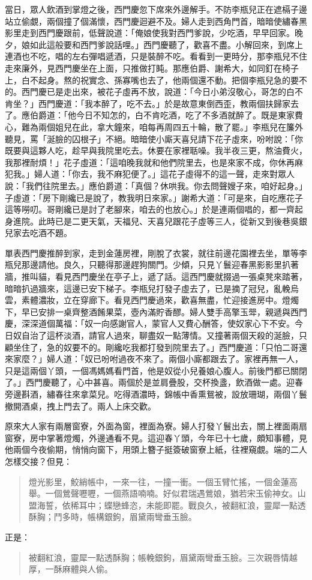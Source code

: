 當日，眾人飲酒到掌燈之後，西門慶忽下席來外邊解手。不防李瓶兒正在遮槅子邊站立偷覷，兩個撞了個滿懷，西門慶迴避不及。婦人走到西角門首，暗暗使繡春黑影里走到西門慶跟前，低聲說道：「俺娘使我對西門爹說，少吃酒，早早回家。晚夕，娘如此這般要和西門爹說話哩。」西門慶聽了，歡喜不盡。小解回來，到席上連酒也不吃，唱的左右彈唱遞酒，只是裝醉不吃。看看到一更時分，那李瓶兒不住走來廉外，見西門慶坐在上面，只推做打盹。那應伯爵、謝希大，如同釘在椅子上，白不起身。熬的祝實念、孫寡嘴也去了，他兩個還不動。把個李瓶兒急的要不的。西門慶已是走出來，被花子虛再不放，說道：「今日小弟沒敬心，哥怎的白不肯坐？」西門慶道：「我本醉了，吃不去。」於是故意東倒西歪，教兩個扶歸家去了。應伯爵道：「他今日不知怎的，白不肯吃酒，吃了不多酒就醉了。既是東家費心，難為兩個姐兒在此，拿大鐘來，咱每再周四五十輪，散了罷。」李瓶兒在簾外聽見，罵「涎臉的囚根子」不絕。暗暗使小廝天喜兒請下花子虛來，吩咐說：「你既要與這夥人吃，趁早與我院里吃去。休要在家裡聒噪。我半夜三更，熬油費火，我那裡耐煩！」花子虛道：「這咱晚我就和他們院里去，也是來家不成，你休再麻犯我。」婦人道：「你去，我不麻犯便了。」這花子虛得不的這一聲，走來對眾人說：「我們往院里去。」應伯爵道：「真個？休哄我。你去問聲嫂子來，咱好起身。」子虛道：「房下剛纔已是說了，教我明日來家。」謝希大道：「可是來，自吃應花子這等嘮叨。哥剛纔已是討了老腳來，咱去的也放心。」於是連兩個唱的，都一齊起身進院。此時已是二更天氣，天福兒、天喜兒跟花子虛等三人，從新又到後巷吳銀兒家去吃酒不題。

單表西門慶推醉到家，走到金蓮房裡，剛脫了衣裳，就往前邊花園裡去坐，單等李瓶兒那邊請他。良久，只聽得那邊趕狗關門。少傾，只見丫鬟迎春黑影影里扒著牆，推叫貓，看見西門慶坐在亭子上，遞了話。這西門慶就掇過一張桌凳來踏著，暗暗扒過牆來，這邊已安下梯子。李瓶兒打發子虛去了，已是摘了冠兒，亂輓烏雲，素體濃妝，立在穿廊下。看見西門慶過來，歡喜無盡，忙迎接進房中。燈燭下，早已安排一桌齊整酒餚果菜，壺內滿貯香醪。婦人雙手高擎玉斝，親遞與西門慶，深深道個萬福：「奴一向感謝官人，蒙官人又費心酬答，使奴家心下不安。今日奴自治了這杯淡酒，請官人過來，聊盡奴一點薄情。又撞著兩個天殺的涎臉，只顧坐住了，急的奴要不的。剛纔吃我都打發到院里去了。」西門慶道：「只怕二哥還來家麼？」婦人道：「奴已吩咐過夜不來了。兩個小廝都跟去了。家裡再無一人，只是這兩個丫頭，一個馮媽媽看門首，他是奴從小兒養娘心腹人。前後門都已關閉了。」西門慶聽了，心中甚喜。兩個於是並肩疊股，交杯換盞，飲酒做一處。迎春旁邊斟酒，繡春往來拿菜兒。吃得酒濃時，錦帳中香熏鴛被，設放珊瑚，兩個丫鬟撤開酒桌，拽上門去了。兩人上床交歡。

原來大人家有兩層窗寮，外面為窗，裡面為寮。婦人打發丫鬟出去，關上裡面兩扇窗寮，房中掌著燈燭，外邊通看不見。這迎春丫頭，今年已十七歲，頗知事體，見他兩個今夜偷期，悄悄向窗下，用頭上簪子挺簽破窗寮上紙，往裡窺覷。端的二人怎樣交接？但見：
\begin{quote}
燈光影里，鮫綃帳中，一來一往，一撞一衝。一個玉臂忙搖，一個金蓮高舉。一個鶯聲嚦嚦，一個燕語喃喃。好似君瑞遇鶯娘，猶若宋玉偷神女。山盟海誓，依稀耳中；蝶戀蜂恣，未能即罷。戰良久，被翻紅浪，靈犀一點透酥胸；鬥多時，帳構銀鉤，眉黛兩彎垂玉臉。
\end{quote}
正是：
\begin{quote}
被翻紅浪，靈犀一點透酥胸；帳輓銀鉤，眉黛兩彎垂玉臉。三次親唇情越厚，一酥麻體與人偷。
\end{quote}


